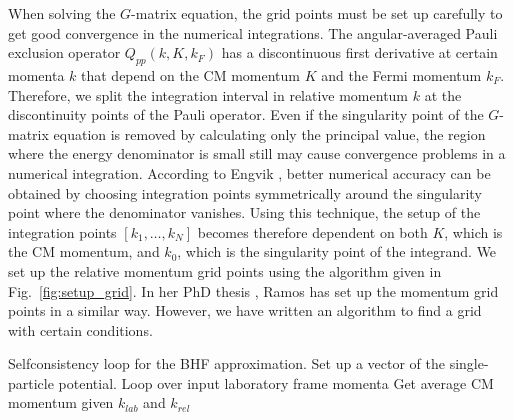 \documentclass[a4paper,12pt]{report}
\begin{document}
When solving the $G$-matrix equation, the grid points must 
be set up carefully to get good convergence in the numerical 
integrations. The angular-averaged Pauli exclusion operator 
$Q_{pp}(k, K, k_{F})$ has a discontinuous first derivative at 
certain momenta $k$ that depend on the CM momentum $K$ and 
the Fermi momentum $k_{F}$. Therefore, we split the 
integration interval in relative momentum $k$ at the 
discontinuity points of the Pauli operator. Even if the 
singularity point of the $G$-matrix equation is removed by 
calculating only the principal value, the region where 
the energy denominator is small still may cause convergence 
problems in a numerical integration. According to Engvik 
\cite{engvik_phd}, better numerical accuracy can be obtained by choosing 
integration points symmetrically around the singularity 
point where the denominator vanishes. Using this technique, 
the setup of the integration points $[k_{1}, \dots , k_{N}]$ 
becomes therefore dependent on both $K$, which is the CM 
momentum, and $k_{0}$, which is the singularity point of 
the integrand. We set up the relative momentum grid points 
using the algorithm given in Fig.~\ref{fig:setup_grid}. In 
her PhD thesis \cite{ramos_phd}, Ramos has set up the 
momentum grid points in a similar way. However, we 
have written an algorithm to find a grid with certain
conditions.

\vspace{1cm}
\begin{algorithmic}
  
    \State     Selfconsistency loop for the BHF approximation.
    \State Set up a vector of the single-particle potential.
    \State Loop over input laboratory frame momenta
    \State Get average CM momentum given $k_{lab}$ and $k_{rel}$ 
    
    
    
    \EndWhile
  
  
\end{algorithmic}

  

\end{document}

